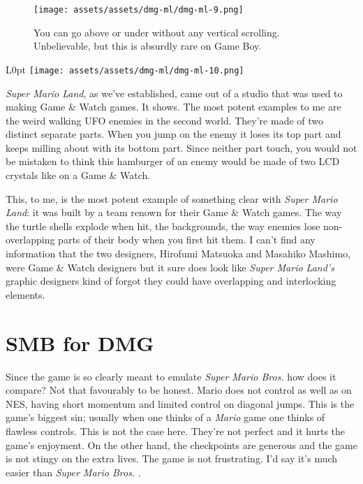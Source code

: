 \documentclass{book}
\begin{document}
\begin{figure}[hbt]
\vskip 10pt
\centering \texttt{[image: assets/assets/dmg-ml/dmg-ml-9.png]}\par\pagetwodescription You can go above or under without any vertical scrolling. Unbelievable, but this is absurdly rare on Game Boy.
\vskip 6pt
\end{figure}

\begin{wrapfigure}{L}{0pt} \texttt{[image: assets/assets/dmg-ml/dmg-ml-10.png]}\end{wrapfigure}
\emph{Super Mario Land}, as we’ve established, came out of a studio that was used to making Game \& Watch games. It shows. The most potent examples to me are the weird walking UFO enemies in the second world. They’re made of two distinct separate parts. When you jump on the enemy it loses its top part and keeps milling about with its bottom part. Since neither part touch, you would not be mistaken to think this hamburger of an enemy would be made of two LCD crystals like on a Game \& Watch.

This, to me, is the most potent example of something clear with \emph{Super Mario Land}: it was built by a team renown for their Game \& Watch games. The way the turtle shells explode when hit, the backgrounds, the way enemies lose non-overlapping parts of their body when you first hit them. I can’t find any information that the two designers, Hirofumi Matsuoka and Masahiko Mashimo, were Game \& Watch designers but it sure does look like \emph{Super Mario Land’s} graphic designers kind of forgot they could have overlapping and interlocking elements.

\FloatBarrier\needspace{5pt}\section*{SMB for DMG}\nopagebreak[4]

Since the game is so clearly meant to emulate \emph{Super Mario Bros.} how does it compare? Not that favourably to be honest. Mario does not control as well as on NES, having short momentum and limited control on diagonal jumps. This is the game’s biggest sin; usually when one thinks of a \emph{Mario} game one thinks of flawless controls. This is not the case here. They’re not perfect and it hurts the game’s enjoyment. On the other hand, the checkpoints are generous and the game is not stingy on the extra lives. The game is not frustrating. I’d say it’s much easier than \emph{Super Mario Bros.} .
\end{document}
